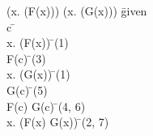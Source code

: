 \documentclass{article}
\begin{document}
\begin{proofbox}
\: (\forall x. (F(x))) \land (\forall x. (G(x))) \= \hbox{given} \\
\open
\: c \= \forallintroconst \\
\: \forall x. (F(x)) \= \andelim(1) \\
\: F(c) \= \forallelim(3) \\
\: \forall x. (G(x)) \= \andelim(1) \\
\: G(c) \= \forallelim(5) \\
\: F(c) \land G(c) \= \andintro(4, 6) \\
\close
\: \forall x. (F(x) \land G(x)) \= \forallintro(2, 7) \\
\end{proofbox}
\end{document}
